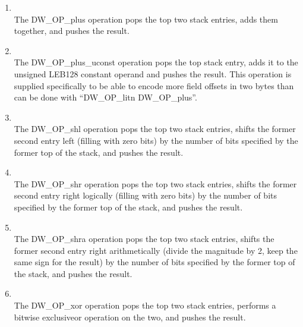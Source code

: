 \begin{enumerate}[1]
\item  {} \\
The DW\_OP\_plus operation pops the top two stack entries,
adds them together, and pushes the result.

\item  {} \\
The DW\_OP\_plus\_uconst operation pops the top stack entry,
adds it to the unsigned LEB128 constant operand and pushes
the result.  This operation is supplied specifically to be
able to encode more field offsets in two bytes than can be
done with “DW\_OP\_litn DW\_OP\_plus”.

\item {} \\
The DW\_OP\_shl operation pops the top two stack entries,
shifts the former second entry left (filling with zero bits)
by the number of bits specified by the former top of the stack,
and pushes the result.

\item {} \\
The DW\_OP\_shr operation pops the top two stack entries,
shifts the former second entry right logically (filling with
zero bits) by the number of bits specified by the former top
of the stack, and pushes the result.

\item {} \\
The DW\_OP\_shra operation pops the top two stack entries,
shifts the former second entry right arithmetically (divide
the magnitude by 2, keep the same sign for the result) by
the number of bits specified by the former top of the stack,
and pushes the result.

\item {} \\
The DW\_OP\_xor operation pops the top two stack entries,
performs a bitwise exclusive\dash or operation on the two, and
pushes the result.

\end{enumerate}


